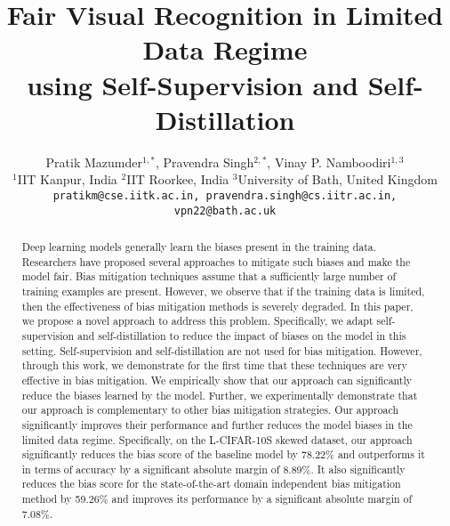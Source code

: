 \documentclass[10pt,twocolumn,letterpaper]{article}
\begin{document}
\title{Fair Visual Recognition in Limited Data Regime\\ using Self-Supervision and Self-Distillation}

\author{Pratik Mazumder$^{1,\ast}$, \hspace{0.5cm} Pravendra Singh$^{2,\ast}$, \hspace{0.5cm} Vinay P. Namboodiri$^{1,3}$ \\
$^1$IIT Kanpur, India\hspace{0.5cm}
$^2$IIT Roorkee, India\hspace{0.5cm}
$^3$University of Bath, United Kingdom\\
{\tt\small pratikm@cse.iitk.ac.in, pravendra.singh@cs.iitr.ac.in, vpn22@bath.ac.uk}
}

\maketitle

\ifvcvcfinal\thispagestyle{empty}\fi




\begin{abstract} 
Deep learning models generally learn the biases present in the training data. Researchers have proposed several approaches to mitigate such biases and make the model fair. Bias mitigation techniques assume that a sufficiently large number of training examples are present. However, we observe that if the training data is limited, then the effectiveness of bias mitigation methods is severely degraded. In this paper, we propose a novel approach to address this problem. Specifically, we adapt self-supervision and self-distillation to reduce the impact of biases on the model in this setting. Self-supervision and self-distillation are not used for bias mitigation. However, through this work, we demonstrate for the first time that these techniques are very effective in bias mitigation. We empirically show that our approach can significantly reduce the biases learned by the model. Further, we experimentally demonstrate that our approach is complementary to other bias mitigation strategies. Our approach significantly improves their performance and further reduces the model biases in the limited data regime. Specifically, on the L-CIFAR-10S skewed dataset, our approach significantly reduces the bias score of the baseline model by 78.22\% and outperforms it in terms of accuracy by a significant absolute margin of 8.89\%. It also significantly reduces the bias score for the state-of-the-art domain independent bias mitigation method by 59.26\% and improves its performance by a significant absolute margin of 7.08\%.
\end{abstract}
\end{document}
